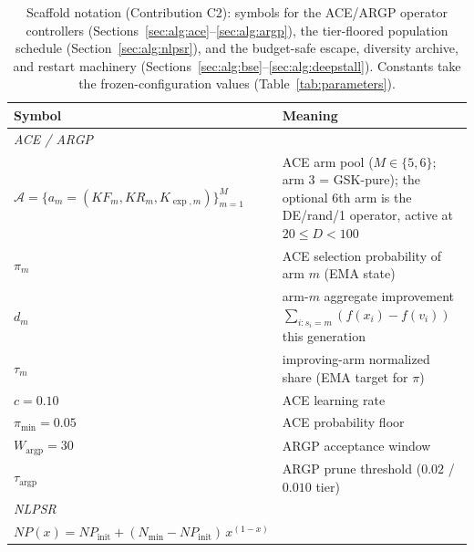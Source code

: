 %
\begin{table}[t]
\caption{Scaffold notation (Contribution C2): symbols for the ACE/ARGP
operator controllers (Sections~\ref{sec:alg:ace}--\ref{sec:alg:argp}), the
tier-floored population schedule (Section~\ref{sec:alg:nlpsr}), and the
budget-safe escape, diversity archive, and restart machinery
(Sections~\ref{sec:alg:bse}--\ref{sec:alg:deepstall}). Constants take the
frozen-configuration values (Table~\ref{tab:parameters}).}
\label{tab:notation-scaffold}
\centering
\footnotesize
\begin{tabular}{@{}l@{\hspace{1.2em}}p{}@{}}
\toprule
\textbf{Symbol} & \textbf{Meaning}\\
\midrule
\multicolumn{2}{l}{\emph{ACE / ARGP}}\\
\midrule
$\mathcal{A}=\{a_m=(KF_m,KR_m,K_{\exp,m})\}_{m=1}^{M}$ &
  ACE arm pool ($M\in\{5,6\}$; arm 3 = GSK-pure); the optional 6th arm is the DE/rand/1 operator, active at $20{\le}D{<}100$\\
$\pi_m$ & ACE selection probability of arm $m$ (EMA state)\\
$d_m$ & arm-$m$ aggregate improvement $\sum_{i:s_i=m}(f(x_i){-}f(v_i))$ this generation\\
$\tau_m$ & improving-arm normalized share (EMA target for $\pi$)\\
$c=0.10$ & ACE learning rate\\
$\pi_{\min}=0.05$ & ACE probability floor\\
$W_{\text{argp}}=30$ & ARGP acceptance window\\
$\tau_{\text{argp}}$ & ARGP prune threshold ($0.02$ / $0.010$ tier)\\
\midrule
\multicolumn{2}{l}{\emph{NLPSR}}\\
\midrule
$NP(x)=NP_{\text{init}}+(N_{\min}-NP_{\text{init}})\,x^{(1-x)}$ &

\end{tabular}
\end{table}
